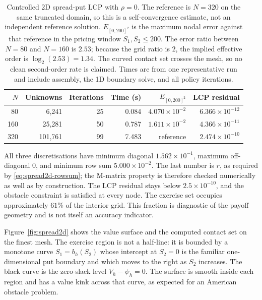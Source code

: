 \documentclass[11pt,a4paper]{article}
\theoremstyle{definition}
\theoremstyle{remark}
\begin{document}
\begin{table}[H]
\centering
\scriptsize
\setlength{\tabcolsep}{4pt}
\begin{tabular}{rrrrrr}
\toprule
$N$ & \textbf{Unknowns} & \textbf{Iterations} & \textbf{Time (s)} &
\textbf{$E_{[0,200]^2}$} & \textbf{LCP residual} \\
\midrule
80  & 6{,}241   & 25 & 0.084 & $4.070\times10^{-2}$ & $6.366\times10^{-12}$ \\
160 & 25{,}281  & 50 & 0.787 & $1.611\times10^{-2}$ & $4.366\times10^{-11}$ \\
320 & 101{,}761 & 99 & 7.483 & reference            & $2.474\times10^{-10}$ \\
\bottomrule
\end{tabular}
\caption{Controlled 2D spread-put LCP with $\rho=0$. The reference is
$N=320$ on the same truncated domain, so this is a self-convergence estimate,
not an independent reference solution. $E_{[0,200]^2}$ is the maximum nodal
error against that reference in the pricing window $S_1,S_2\le200$. The
error ratio between $N=80$ and $N=160$ is $2.53$; because the grid ratio is
$2$, the implied effective order is $\log_2(2.53)=1.34$. The curved contact
set crosses the mesh, so no clean second-order rate is claimed. Times are
from one representative run and include assembly, the 1D boundary solve, and
all policy iterations.}
\label{tab:spread2d}
\end{table}

All three discretisations have minimum diagonal $1.562\times10^{-1}$,
maximum off-diagonal $0$, and minimum row sum $5.000\times10^{-2}$. The
last number is $r$, as required by \eqref{eq:spread2d-rowsum}; the M-matrix
property is therefore checked numerically as well as by construction. The LCP
residual stays below $2.5\times10^{-10}$, and the obstacle constraint is
satisfied at every node. The exercise set occupies approximately $61\%$ of the
interior grid. This fraction is diagnostic of the payoff geometry and is not
itself an accuracy indicator.

Figure~\ref{fig:spread2d} shows the value surface and the computed contact set
on the finest mesh. The exercise region is not a half-line: it is bounded by a
monotone curve $S_1=b_h(S_2)$ whose intercept at $S_2=0$ is the familiar
one-dimensional put boundary and which moves to the right as $S_2$ increases.
The black curve is the zero-slack level $V_h-\psi_h=0$. The surface is smooth
inside each region and has a value kink across that curve, as expected for an
American obstacle problem.
\end{document}
